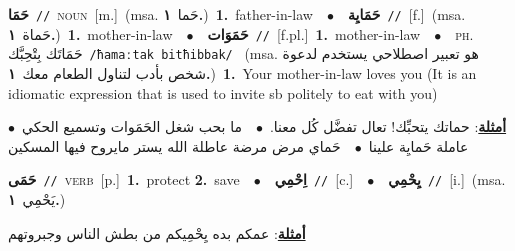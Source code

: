 \documentclass[10pt,a4paper,twoside]{article} %
\begin{document}
\begin{multicols}{2}
{\setlength\topsep{0pt}\textbf{\foreignlanguage{arabic}{حَمَا}}\ {\color{gray}\texttt{//}\color{black}}\ \textsc{noun}\ [m.]\ \color{gray}(msa. \foreignlanguage{arabic}{حَما}~\foreignlanguage{arabic}{\textbf{١.}})\color{black}\ \textbf{1.}~father-in-law\ \ $\bullet$\ \ \setlength\topsep{0pt}\textbf{\foreignlanguage{arabic}{حَمَايِة}}\ {\color{gray}\texttt{//}\color{black}}\ [f.]\ \color{gray}(msa. \foreignlanguage{arabic}{حَماة}~\foreignlanguage{arabic}{\textbf{١.}})\color{black}\ \textbf{1.}~mother-in-law\ \ $\bullet$\ \ \setlength\topsep{0pt}\textbf{\foreignlanguage{arabic}{حَمَوَات}}\ {\color{gray}\texttt{//}\color{black}}\ [f.pl.]\ \textbf{1.}~mother-in-law\ \ $\bullet$\ \ \textsc{ph.} \color{gray} \foreignlanguage{arabic}{حَمَاتَك بِتْحِبَّك}\color{black}\ {\color{gray}\texttt{/{\sffamily ħamaːtak bitħibbak}/}\color{black}}\ \color{gray} (msa. \foreignlanguage{arabic}{هو تعبير اصطلاحي يستخدم لدعوة شخص بأدب لتناول الطعام معك}~\foreignlanguage{arabic}{\textbf{١.}})\color{black}\ \textbf{1.}~Your mother-in-law loves you (It is an idiomatic expression that is used to invite sb politely to eat with you)\  \begin{flushright}\color{gray}\foreignlanguage{arabic}{\textbf{\underline{\foreignlanguage{arabic}{أمثلة}}}: حماتك يتحبِّك! تعال تفضَّل كُل معنا.\ $\bullet$\ \  ما بحب شغل الحَمَوات وتسميع الحكي\ $\bullet$\ \  عاملة حَمايِة علينا\ $\bullet$\ \  حَماي مرض مرضة عاطلة الله يستر مايروح فيها المسكين}\end{flushright}\color{black}} \vspace{2mm}

{\setlength\topsep{0pt}\textbf{\foreignlanguage{arabic}{حَمَى}}\ {\color{gray}\texttt{//}\color{black}}\ \textsc{verb}\ [p.]\ \textbf{1.}~protect  \textbf{2.}~save\ \ $\bullet$\ \ \setlength\topsep{0pt}\textbf{\foreignlanguage{arabic}{اِحْمِي}}\ {\color{gray}\texttt{//}\color{black}}\ [c.]\ \ $\bullet$\ \ \setlength\topsep{0pt}\textbf{\foreignlanguage{arabic}{يِحْمِي}}\ {\color{gray}\texttt{//}\color{black}}\ [i.]\ \color{gray}(msa. \foreignlanguage{arabic}{يَحْمِي}~\foreignlanguage{arabic}{\textbf{١.}})\color{black}\  \begin{flushright}\color{gray}\foreignlanguage{arabic}{\textbf{\underline{\foreignlanguage{arabic}{أمثلة}}}: عمكم بده يِحْمِيكم من بطش الناس وجبروتهم}\end{flushright}\color{black}} \vspace{2mm}


\end{multicols}
\end{document}
